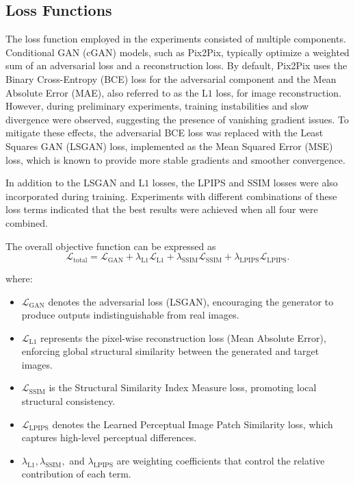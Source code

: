 \subsection{Loss Functions}
\label{subsec:losses}
The loss function employed in the experiments consisted of multiple components. Conditional GAN (cGAN) models, such as Pix2Pix, typically optimize a weighted sum of an adversarial loss and a reconstruction loss. By default, Pix2Pix uses the Binary Cross-Entropy (BCE) loss for the adversarial component and the Mean Absolute Error (MAE), also referred to as the $\mathrm{L1}$ loss, for image reconstruction. However, during preliminary experiments, training instabilities and slow divergence were observed, suggesting the presence of vanishing gradient issues. To mitigate these effects, the adversarial BCE loss was replaced with the Least Squares GAN (LSGAN) loss, implemented as the Mean Squared Error (MSE) loss, which is known to provide more stable gradients and smoother convergence.

In addition to the LSGAN and $\mathrm{L1}$ losses, the LPIPS and SSIM losses were also incorporated during training. Experiments with different combinations of these loss terms indicated that the best results were achieved when all four were combined. 

The overall objective function can be expressed as
\begin{equation}
\mathcal{L}_{\text{total}} =
\mathcal{L}_{\text{GAN}} +
\lambda_{\text{L1}} \mathcal{L}_{\text{L1}} +
\lambda_{\text{SSIM}} \mathcal{L}_{\text{SSIM}} +
\lambda_{\text{LPIPS}} \mathcal{L}_{\text{LPIPS}}.
\end{equation}

where:
\begin{itemize}
    \item $\mathcal{L}_{\text{GAN}}$ denotes the adversarial loss (LSGAN), encouraging the generator to produce outputs indistinguishable from real images. 
    \item $\mathcal{L}_{\text{L1}}$ represents the pixel-wise reconstruction loss (Mean Absolute Error), enforcing global structural similarity between the generated and target images.
    \item $\mathcal{L}_{\text{SSIM}}$ is the Structural Similarity Index Measure loss, promoting local structural consistency.
    \item $\mathcal{L}_{\text{LPIPS}}$ denotes the Learned Perceptual Image Patch Similarity loss, which captures high-level perceptual differences.
    \item $\lambda_{\text{L1}}, \lambda_{\text{SSIM}},$ and $\lambda_{\text{LPIPS}}$ are weighting coefficients that control the relative contribution of each term.
\end{itemize}

